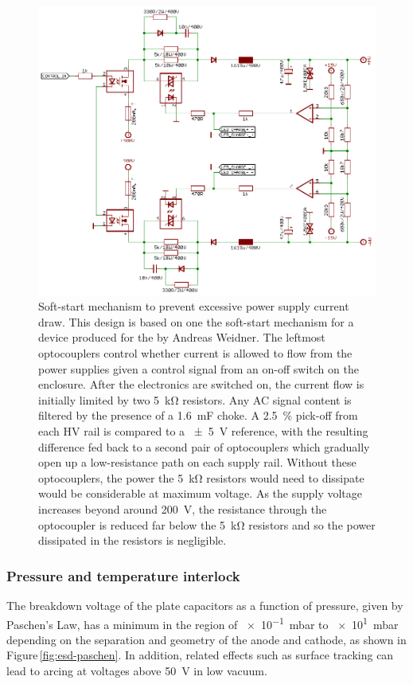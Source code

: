 \begin{figure}
  \centering
  \includegraphics[width=\columnwidth]{graphics/60-hv-amp-soft-start.pdf}
  \caption[High voltage amplifier soft-start schematic]{\label{fig:hv-amp-soft-start}Soft-start mechanism to prevent excessive power supply current draw. This design is based on one the soft-start mechanism for a device produced for the \AEIPROTOTYPE{} by Andreas Weidner. The leftmost optocouplers control whether current is allowed to flow from the power supplies given a control signal from an on-off switch on the enclosure. After the electronics are switched on, the current flow is initially limited by two \SI{5}{\kilo\ohm} resistors. Any \gls{AC} signal content is filtered by the presence of a \SI{1.6}{\milli\farad} choke. A \SI{2.5}{\percent} pick-off from each \gls{HV} rail is compared to a \SI{\pm5}{\volt} reference, with the resulting difference fed back to a second pair of optocouplers which gradually open up a low-resistance path on each supply rail. Without these optocouplers, the power the \SI{5}{\kilo\ohm} resistors would need to dissipate would be considerable at maximum voltage. As the supply voltage increases beyond around \SI{200}{\volt}, the resistance through the optocoupler is reduced far below the \SI{5}{\kilo\ohm} resistors and so the power dissipated in the resistors is negligible.}
\end{figure}

\subsubsection{Pressure and temperature interlock}
The breakdown voltage of the plate capacitors as a function of pressure, given by Paschen's Law, has a minimum in the region of \SI{e-1}{\milli\bar} to \SI{e1}{\milli\bar} depending on the separation and geometry of the anode and cathode, as shown in Figure\,\ref{fig:esd-paschen}. In addition, related effects such as surface tracking can lead to arcing at voltages above \SI{50}{\volt} in low vacuum.

